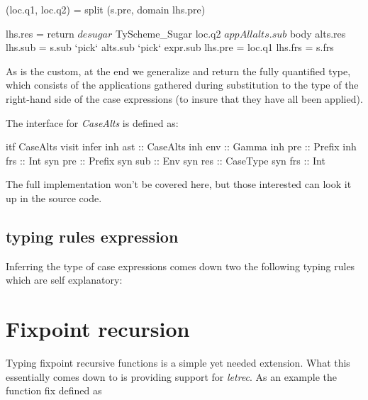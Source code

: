 \begin{code}       
       (loc.q1, loc.q2) = split (s.pre, domain lhs.pre)
       
       lhs.res = return $ desugar $ TyScheme_Sugar loc.q2 $ appAll alts.sub $ body alts.res
       lhs.sub = s.sub `pick` alts.sub `pick` expr.sub
       lhs.pre = loc.q1
       lhs.frs = s.frs
\end{code}
As is the custom, at the end we generalize and return the fully quantified type, which consists of the applications gathered during substitution to the type of the right-hand side of the case expressions (to insure that they have all been applied). 

The interface for \emph{CaseAlts} is defined as:
\begin{code}
itf CaseAlts
  visit infer
    inh ast :: CaseAlts
    inh env :: Gamma
    inh pre :: Prefix
    inh frs :: Int
    syn pre :: Prefix
    syn sub :: Env
    syn res :: CaseType
    syn frs :: Int 
\end{code}

The full implementation won't be covered here, but those interested can look it up in the source code.

\subsection{typing rules expression}
Inferring the type of case expressions comes down two the following typing rules which are self explanatory:

\begin{prooftree}
\end{prooftree}

\begin{prooftree}
\end{prooftree} 
\section{Fixpoint recursion}
Typing fixpoint recursive functions is a simple yet needed extension. What this essentially comes down to is providing support for \emph{letrec}. As an example the function fix defined as

